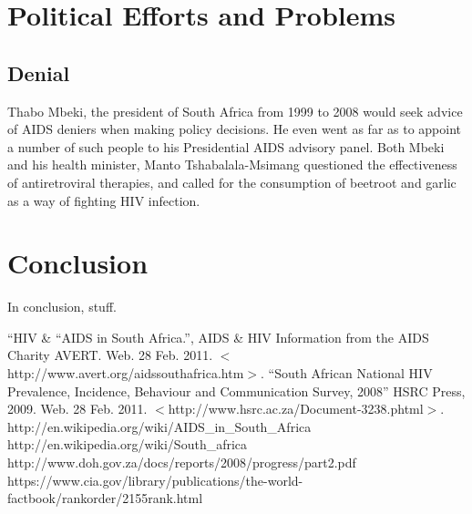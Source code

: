 \documentclass[12pt]{report}
\begin{document}
\section{Political Efforts and Problems}
\subsection{Denial}
Thabo Mbeki, the president of South Africa from 1999 to 2008 would seek advice of AIDS deniers when making policy decisions.  
He even went as far as to appoint a number of such people to his Presidential AIDS advisory panel.  
Both Mbeki and his health minister, Manto Tshabalala-Msimang questioned the effectiveness of antiretroviral therapies, and called for the consumption of beetroot and garlic as a way of fighting HIV infection.

\section{Conclusion}
In conclusion, stuff.
\begin{thebibliography}{99}
    ``HIV \& ``AIDS in South Africa.'',
        AIDS \& HIV Information from the AIDS Charity AVERT. Web. 28 Feb. 2011. $<$http://www.avert.org/aidssouthafrica.htm$>$.
    ``South African National HIV Prevalence, Incidence, Behaviour and Communication Survey, 2008''
        HSRC Press, 2009. Web. 28 Feb. 2011. $<$http://www.hsrc.ac.za/Document-3238.phtml$>$. 
    http://en.wikipedia.org/wiki/AIDS\_in\_South\_Africa
    http://en.wikipedia.org/wiki/South\_africa
    http://www.doh.gov.za/docs/reports/2008/progress/part2.pdf
    https://www.cia.gov/library/publications/the-world-factbook/rankorder/2155rank.html
\end{thebibliography}
\end{document}
